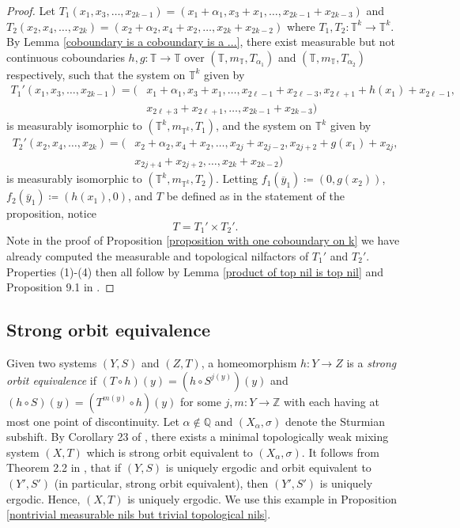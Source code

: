 \documentclass[12pt]{amsart}
\theoremstyle{definition}
\theoremstyle{plain}
\theoremstyle{definition}
\numberwithin{equation}{section}
\begin{document}
\begin{proof}

Let $T_1(x_1,x_3,\dots,x_{2k-1})=(x_1+\alpha_1,x_3+x_1,\dots,x_{2k-1}+x_{2k-3})$ and \newline $T_2(x_2,x_4,\dots,x_{2k})=(x_2+\alpha_2,x_4+x_2,\dots,x_{2k}+x_{2k-2})$ where $T_1,T_2\colon\mathbb{T}^{k}\rightarrow \mathbb{T}^{k}.$ By Lemma \ref{coboundary is a coboundary is a ...}, there exist measurable but not continuous coboundaries $h,g\colon\mathbb{T} \rightarrow \mathbb{T}$ over $(\mathbb{T},m_{\mathbb{T}},T_{\alpha_1})$ and $(\mathbb{T},m_{\mathbb{T}},T_{\alpha_2})$ respectively, such that the system on $\mathbb{T}^{k}$ given by 
\begin{align*}
T_1'(x_1,x_3,\dots,x_{2k-1})=(&x_1+\alpha_1,x_3+x_1,\dots,x_{2\ell-1}+x_{2\ell-3},x_{2\ell+1}+h(x_1)+x_{2\ell-1},\\ &x_{2\ell+3}+x_{2\ell+1},\dots,x_{2k-1}+x_{2k-3})
\end{align*}
is measurably isomorphic to $(\mathbb{T}^k,m_{\mathbb{T}^k},T_1)$, and the system on $\mathbb{T}^{k}$ given by 
\begin{align*}
T_2'(x_2,x_4,\dots,x_{2k})= (&x_2+\alpha_2,x_4+x_2,\dots,x_{2j}+x_{2j-2},x_{2j+2}+g(x_1)+x_{2j},\\ &x_{2j+4}+x_{2j+2},\dots,x_{2k}+x_{2k-2})
\end{align*}
 is measurably isomorphic to $(\mathbb{T}^k,m_{\mathbb{T}^k},T_2)$. Letting $f_1(\overline{y}_1)\coloneqq(0,g(x_2))$, $f_2(\overline{y}_1)\coloneqq(h(x_1),0)$, and $T$ be defined as in the statement of the proposition, notice $$T=T_1' \times T_2'.$$ Note in the proof of Proposition \ref{proposition with one coboundary on k} we have already computed the measurable and topological nilfactors of $T_1'$ and $T_2'$. Properties (1)-(4) then all follow by Lemma \ref{product of top nil is top nil} and Proposition 9.1 in \cite{Radic}. \end{proof}
 
 \subsection{Strong orbit equivalence}\label{strong orbit equivalence}

Given two systems $(Y,S)$ and $(Z,T)$, a homeomorphism $h\colon Y \rightarrow Z$ is a \textit{strong orbit equivalence} if $(T\circ h)(y)=(h \circ S^{j(y)})(y)$ and $(h \circ S)(y)=(T^{m(y)} \circ h)(y)$ for some $j,m\colon Y \rightarrow \mathbb{Z}$ with each having at most one point of discontinuity. Let $\alpha \notin \mathbb{Q}$ and $(X_\alpha,\sigma)$ denote the Sturmian subshift. By Corollary 23 of \cite{nontrivial Kronecker trivial MEF}, there exists a minimal topologically weak mixing system $(X,T)$ which is strong orbit equivalent to $(X_{\alpha},\sigma)$. It follows from Theorem 2.2 in \cite{Giordano}, that if $(Y,S)$ is uniquely ergodic and orbit equivalent to $(Y',S')$ (in particular, strong orbit equivalent), then $(Y',S')$ is uniquely ergodic. Hence, $(X,T)$ is uniquely ergodic. We use this example in Proposition \ref{nontrivial measurable nils but trivial topological nils}.
 
\end{document}
